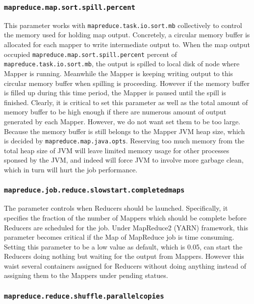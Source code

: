 \subsubsection{\texttt{mapreduce.map.sort.spill.percent}}

This parameter works with \texttt{mapreduce.task.io.sort.mb} collectively to 
control the memory used for holding map output. Concretely, a circular memory 
buffer is allocated for each mapper to write intermediate output to. When the 
map output occupied \texttt{mapreduce.map.sort.spill.percent} percent of \\
\texttt{mapreduce.task.io.sort.mb}, the output is spilled to local disk of node
where Mapper is running. Meanwhile the Mapper is keeping writing output to this
circular memory buffer when spilling is proceeding. However if the memory buffer
is filled up during this time period, the Mapper is paused until the spill is
finished. Clearly, it is critical to set this parameter as well as the total 
amount of memory buffer to be high enough if there are numerous amount of output
generated by each Mapper. However, we do not want set them to be too large.
Because the memory buffer is still belongs to the Mapper JVM heap size, which is
decided by \texttt{mapreduce.map.java.opts}. Reserving too much memory from the
total heap size of JVM will leave limited memory usage for other processes sponsed
by the JVM, and indeed will force JVM to involve more garbage clean, which in 
turn will hurt the job performance.    

\subsubsection{\texttt{mapreduce.job.reduce.slowstart.completedmaps}}

The parameter controls when Reducers should be launched. Specifically, it specifies
the fraction of the number of Mappers which should be complete before Reducers
are scheduled for the job. Under MapReduce2 (YARN) framework, this parameter
becomes critical if the Map of MapReduce job is time consuming. Setting this 
parameter to be a low value as default, which is 0.05, can start the Reducers
doing nothing but waiting for the output from Mappers. However this waist several
containers assigned for Reducers without doing anything instead of assigning them
to the Mappers under pending statues.   

\subsubsection{\texttt{mapreduce.reduce.shuffle.parallelcopies}}

